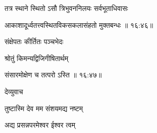 \nemslokac

{\devanagarifont तत्र स्थाने स्थितो ऽसौ त्रिभुवननिलयः सर्वभूताधिवासः }%
  \dontdisplaylinenum


\nemslokad

{\devanagarifont आकाशादूर्ध्वतत्त्वस्थितविकसकलासंहतो मुक्तबन्धः {॥ १६:४६॥} \veg\dontdisplaylinenum }%

\nemslokanormal


\ujvers{}    %


\nemslokab

{\devanagarifont संक्षेपतः कीर्तितः पञ्चभेदः  \danda\dontdisplaylinenum }%
 
\nemslokac

{\devanagarifont श्रोतुं किमन्यद्विजिगीषितार्थम् }%
  \dontdisplaylinenum    {}%



\nemslokad

{\devanagarifont संसारमोक्षेण च तत्परो ऽस्ति {॥ १६:४७॥} \veg\dontdisplaylinenum }%
 
\vers


{\devanagarifont देव्युवाच {\dandab}\dontdisplaylinenum  }%
 
\nemsloka 
{\devanagarifont तुष्टास्मि देव मम संशयमद्य नष्टम् }%
  \dontdisplaylinenum    {}%


\nemslokab

{\devanagarifont अद्य प्रसन्नपरमेश्वर ईश्वर त्वम्  \danda\dontdisplaylinenum }%

